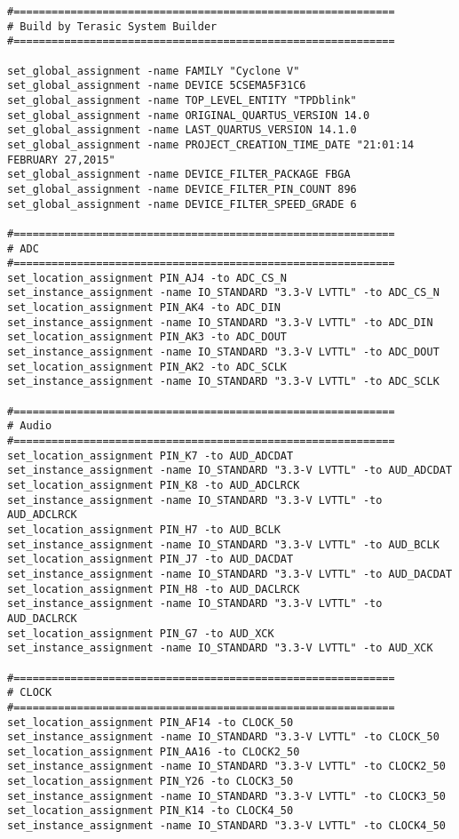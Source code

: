 \documentclass[dvipdfm]{book}
\begin{document}
\begin{verbatim}
#============================================================
# Build by Terasic System Builder
#============================================================

set_global_assignment -name FAMILY "Cyclone V"
set_global_assignment -name DEVICE 5CSEMA5F31C6
set_global_assignment -name TOP_LEVEL_ENTITY "TPDblink"
set_global_assignment -name ORIGINAL_QUARTUS_VERSION 14.0
set_global_assignment -name LAST_QUARTUS_VERSION 14.1.0
set_global_assignment -name PROJECT_CREATION_TIME_DATE "21:01:14 FEBRUARY 27,2015"
set_global_assignment -name DEVICE_FILTER_PACKAGE FBGA
set_global_assignment -name DEVICE_FILTER_PIN_COUNT 896
set_global_assignment -name DEVICE_FILTER_SPEED_GRADE 6

#============================================================
# ADC
#============================================================
set_location_assignment PIN_AJ4 -to ADC_CS_N
set_instance_assignment -name IO_STANDARD "3.3-V LVTTL" -to ADC_CS_N
set_location_assignment PIN_AK4 -to ADC_DIN
set_instance_assignment -name IO_STANDARD "3.3-V LVTTL" -to ADC_DIN
set_location_assignment PIN_AK3 -to ADC_DOUT
set_instance_assignment -name IO_STANDARD "3.3-V LVTTL" -to ADC_DOUT
set_location_assignment PIN_AK2 -to ADC_SCLK
set_instance_assignment -name IO_STANDARD "3.3-V LVTTL" -to ADC_SCLK

#============================================================
# Audio
#============================================================
set_location_assignment PIN_K7 -to AUD_ADCDAT
set_instance_assignment -name IO_STANDARD "3.3-V LVTTL" -to AUD_ADCDAT
set_location_assignment PIN_K8 -to AUD_ADCLRCK
set_instance_assignment -name IO_STANDARD "3.3-V LVTTL" -to AUD_ADCLRCK
set_location_assignment PIN_H7 -to AUD_BCLK
set_instance_assignment -name IO_STANDARD "3.3-V LVTTL" -to AUD_BCLK
set_location_assignment PIN_J7 -to AUD_DACDAT
set_instance_assignment -name IO_STANDARD "3.3-V LVTTL" -to AUD_DACDAT
set_location_assignment PIN_H8 -to AUD_DACLRCK
set_instance_assignment -name IO_STANDARD "3.3-V LVTTL" -to AUD_DACLRCK
set_location_assignment PIN_G7 -to AUD_XCK
set_instance_assignment -name IO_STANDARD "3.3-V LVTTL" -to AUD_XCK

#============================================================
# CLOCK
#============================================================
set_location_assignment PIN_AF14 -to CLOCK_50
set_instance_assignment -name IO_STANDARD "3.3-V LVTTL" -to CLOCK_50
set_location_assignment PIN_AA16 -to CLOCK2_50
set_instance_assignment -name IO_STANDARD "3.3-V LVTTL" -to CLOCK2_50
set_location_assignment PIN_Y26 -to CLOCK3_50
set_instance_assignment -name IO_STANDARD "3.3-V LVTTL" -to CLOCK3_50
set_location_assignment PIN_K14 -to CLOCK4_50
set_instance_assignment -name IO_STANDARD "3.3-V LVTTL" -to CLOCK4_50


\end{verbatim}
\end{document}
